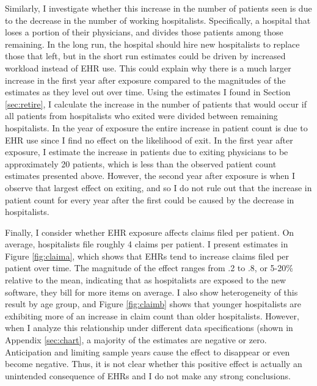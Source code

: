 \documentclass[12pt]{article}
\begin{document}
Similarly, I investigate whether this increase in the number of patients seen is due to the decrease in the number of working hospitalists. Specifically, a hospital that loses a portion of their physicians, and divides those patients among those remaining. In the long run, the hospital should hire new hospitalists to replace those that left, but in the short run estimates could be driven by increased workload instead of EHR use. This could explain why there is a much larger increase in the first year after exposure compared to the magnitudes of the estimates as they level out over time. Using the estimates I found in Section \ref{sec:retire}, I calculate the increase in the number of patients that would occur if all patients from hospitalists who exited were divided between remaining hospitalists. In the year of exposure the entire increase in patient count is due to EHR use since I find no effect on the likelihood of exit. In the first year after exposure, I estimate the increase in patients due to exiting physicians to be approximately 20 patients, which is less than the observed patient count estimates presented above. However, the second year after exposure is when I observe that largest effect on exiting, and so I do not rule out that the increase in patient count for every year after the first could be caused by the decrease in hospitalists. 

Finally, I consider whether EHR exposure affects claims filed per patient. On average, hospitalists file roughly 4 claims per patient. I present estimates in Figure \ref{fig:claima}, which shows that EHRs tend to increase claims filed per patient over time. The magnitude of the effect ranges from .2 to .8, or 5-20\% relative to the mean, indicating that as hospitalists are exposed to the new software, they bill for more items on average.  I also show heterogeneity of this result by age group, and Figure \ref{fig:claimb} shows that younger hospitalists are exhibiting more of an increase in claim count than older hospitalists. However, when I analyze this relationship under different data specifications (shown in Appendix \ref{sec:chart}, a majority of the estimates are negative or zero. Anticipation and limiting sample years cause the effect to disappear or even become negative. Thus, it is not clear whether this positive effect is actually an unintended consequence of EHRs and I do not make any strong conclusions. 


     
\end{document}
